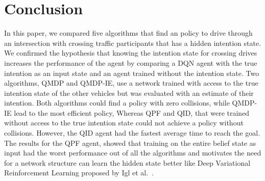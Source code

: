 	\section{Conclusion}
	\label{sec:conclusion}
	In this paper, we compared five algorithms that find an policy to drive through an intersection with crossing traffic participants that has a hidden intention state. We confirmed the hypothesis that knowing the intention state for crossing drives increases the performance of the agent by comparing a DQN agent with the true intention as an input state and an agent trained without the intention state. 
	Two algorithms, QMDP and QMDP-IE, use a network trained with access to the true intention state of the other vehicles but was evaluated with an estimate of their intention. Both algorithms could find a policy with zero collisions, while QMDP-IE lead to the most efficient policy, Whereas QPF and QID, that were trained without access to the true intention state could not achieve a policy without collisions. 
	However, the QID agent had the fastest average time to reach the goal. The results for the QPF agent, showed that training on the entire belief state as input had the worst performance out of all the algorithms and motivates the need for a network structure can learn the hidden state better like Deep Variational Reinforcement Learning proposed by Igl et al.~\cite{Igl2018}. 
	